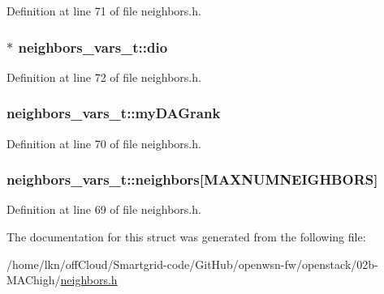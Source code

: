 Definition at line 71 of file neighbors.\+h.

\subsubsection[{\texorpdfstring{dio}{dio}}]{$\ast$ neighbors\+\_\+vars\+\_\+t\+::dio}\hypertarget{structneighbors__vars__t_a09c8cef2e547e5772a515f1eabcf6a50}{}\label{structneighbors__vars__t_a09c8cef2e547e5772a515f1eabcf6a50}


Definition at line 72 of file neighbors.\+h.

\subsubsection[{\texorpdfstring{my\+D\+A\+Grank}{myDAGrank}}]{ neighbors\+\_\+vars\+\_\+t\+::my\+D\+A\+Grank}\hypertarget{structneighbors__vars__t_ad1da31e11ab0382ffbf1189e7803abcb}{}\label{structneighbors__vars__t_ad1da31e11ab0382ffbf1189e7803abcb}


Definition at line 70 of file neighbors.\+h.

\subsubsection[{\texorpdfstring{neighbors}{neighbors}}]{ neighbors\+\_\+vars\+\_\+t\+::neighbors\mbox{[}{\bf M\+A\+X\+N\+U\+M\+N\+E\+I\+G\+H\+B\+O\+RS}\mbox{]}}\hypertarget{structneighbors__vars__t_a0c28f8211f44d7a1ac87fb0f20832830}{}\label{structneighbors__vars__t_a0c28f8211f44d7a1ac87fb0f20832830}


Definition at line 69 of file neighbors.\+h.



The documentation for this struct was generated from the following file\+:\begin{DoxyCompactItemize}
\item 
/home/lkn/off\+Cloud/\+Smartgrid-\/code/\+Git\+Hub/openwsn-\/fw/openstack/02b-\/\+M\+A\+Chigh/\hyperlink{neighbors_8h}{neighbors.\+h}\end{DoxyCompactItemize}
